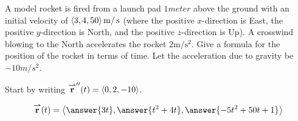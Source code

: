 \documentclass{ximera}
\begin{document}
\begin{exercise}
  A model rocket is fired from a launch pad $1\unit{meter}$ above the
  ground with an initial velocity of
  $\left\langle 3,4,50\right\rangle\mathop{}\!\mathrm{m}/\mathop{}\!\mathrm{s}$ (where the positive
  $x$-direction is East, the positive $y$-direction is North, and the
  positive $z$-direction is Up). A crosswind blowing to the North
  accelerates the rocket $2\text{m}/\text{s}^2$. Give a formula for
  the position of the rocket in terms of time. Let the acceleration
  due to gravity be $-10\unit{m}/\unit{s}^2$.
  \begin{hint}
    Start by writing ${\overset{\boldsymbol{\rightharpoonup}}{\mathbf{r}}}''(t) = \left\langle 0,2,-10\right\rangle$.
  \end{hint}
  \[
  \vec{r}(t) = \vector{\answer{3t},\answer{t^2+4t},\answer{-5t^2+50t+1}}
  \]
\end{exercise}
\end{document}
